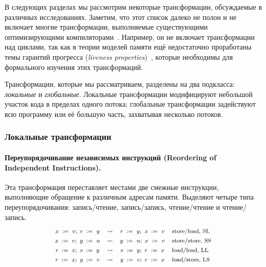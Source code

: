 В следующих разделах мы рассмотрим  некоторые  трансформации,
обсуждаемые в различных исследованиях. 
Заметим, что этот список далеко не полон 
и не включает многие трансформации, 
выполняемые существующими оптимизирующими компиляторами~\cite{Muchnick:ACDI97}.
Например, он не включает трансформации над циклами,
так как в теории моделей памяти ещё недостаточно 
проработаны темы гарантий прогресса 
(\emph{liveness properties})~\cite{Lahav-al:arXiv20}, 
которые необходимы для формального 
изучения этих трансформаций. 

Трансформации, которые мы рассматриваем,  
разделены на два подкласса: \emph{локальные} и \emph{глобальные}.
Локальные трансформации модифицируют  
небольшой участок кода в пределах одного потока; 
глобальные трансформации задействуют  всю программу 
или её большую часть, захватывая несколько потоков.      
 
\subsubsection{Локальные трансформации}

\paragraph{
Переупорядочивание независимых инструкций
(Reordering of Independent Instructions).
} 

Эта трансформация переставляет местами  
две смежные инструкции, выполняющие обращение к 
различным адресам памяти. 
Выделяют  четыре типа переупорядочивания:
запись/чтение, запись/запись,
чтение/чтение и чтение/запись. 
%
\[\def\arraystretch{1.4}\footnotesize
  \begin{array}{cccl} 

      \writeInst{}{x}{v} \seq \readInst{}{r}{y} 
    & \leadsto 
    & \readInst{}{r}{y} \seq \writeInst{}{x}{v}
    & \text{store/load, SL}  \\ 

      \writeInst{}{x}{v} \seq \writeInst{}{y}{u} 
    & \leadsto 
    & \writeInst{}{y}{u} \seq \writeInst{}{x}{v}
    & \text{store/store, SS}  \\ 

      \readInst{}{r}{x} \seq \readInst{}{s}{y} 
    & \leadsto 
    & \readInst{}{s}{y} \seq \readInst{}{r}{x}
    & \text{load/load, LL}  \\ 

      \readInst{}{r}{x} \seq \writeInst{}{y}{v} 
    & \leadsto 
    & \writeInst{}{y}{v} \seq \readInst{}{r}{x}
    & \text{load/store, LS}  \\ 

  \end{array}
\]


